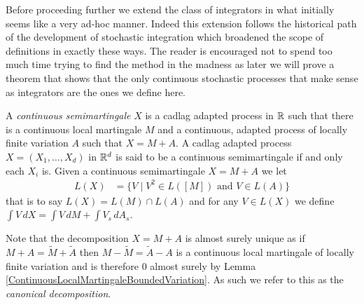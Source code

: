 Before proceeding further we extend the class of integrators in what initially seems like a very ad-hoc manner.  Indeed this extension follows the historical path of the development of stochastic integration which broadened the scope of definitions in exactly these ways.  The reader is encouraged not to spend too much time trying to find the method in the madness as later we will prove a theorem that shows that the only continuous stochastic processes that make sense as integrators are the ones we define here.
\begin{defn}A \emph{continuous  semimartingale} $X$ is a cadlag adapted process in $\mathbb{R}$ such that there is a continuous local martingale $M$ and a continuous, adapted process of locally finite variation $A$ such that $X = M + A$.  A cadlag adapted process $X=(X_1, \dotsc, X_d)$ in $\mathbb{R}^d$ is said to be a continuous semimartingale if and only each $X_i$ is.  Given a continuous semimartingale $X = M + A$ we let 
\begin{align*}
L(X) &= \lbrace V \mid V^2 \in L([M]) \text{ and } V \in L(A) \rbrace
\end{align*}
that is to say $L(X) = L(M) \cap L(A)$ and for any $V \in L(X)$ we define $\int V \, dX = \int V \, dM + \int V_s \, dA_s$.
\end{defn} 
Note that the decomposition $X = M + A$ is almost surely unique as if $M + A = \tilde{M} + \tilde{A}$ then $M - \tilde{M} = \tilde{A} - A$ is a continuous local martingale of locally finite variation and is therefore $0$ almost surely by Lemma \ref{ContinuousLocalMartingaleBoundedVariation}.  As such we refer to this as the \emph{canonical decomposition}.

